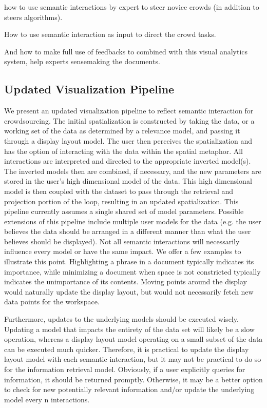 \documentclass[journal]{vgtc}                %
\begin{document}
how to use semantic interactions by expert to steer novice crowds (in addition to steers algorithms). 

How to use semantic interaction as input to direct the crowd tasks.

And how to make full use of feedbacks to combined with this visual analytics system, help experts sensemaking the documents.


\subsection{Updated Visualization Pipeline}

We present an updated visualization pipeline to reflect semantic interaction for crowdsourcing. 
The initial spatialization is constructed by taking the data, or a working set of the data as determined by a relevance model, and passing it through a display layout model. 
The user then perceives the spatialization and has the option of interacting with the data within the spatial metaphor. 
All interactions are interpreted and directed to the appropriate inverted model(s). 
The inverted models then are combined, if necessary, and the new parameters are stored in the user’s high dimensional model of the data.
This high dimensional model is then coupled with the dataset to pass through the retrieval and projection portion of the loop, resulting in an updated spatialization. 
This pipeline currently assumes a single shared set of model parameters. 
Possible extensions of this pipeline include multiple user models for the data (e.g. the user believes the data should be arranged in a different manner than what the user believes should be displayed).
Not all semantic interactions will necessarily influence every model or have the same impact. 
We offer a few examples to illustrate this point. 
Highlighting a phrase in a document typically indicates its importance, while minimizing a document when space is not constricted typically indicates the unimportance of its contents.
Moving points around the display would naturally update the display layout, but would not necessarily fetch new data points for the workspace.

Furthermore, updates to the underlying models should be executed wisely. 
Updating a model that impacts the entirety of the data set will likely be a slow operation, whereas a display layout model operating on a small subset of the data can be executed much quicker. 
Therefore, it is practical to update the display layout model with each semantic interaction, but it may not be practical to do so for the information retrieval model.
Obviously, if a user explicitly queries for information, it should be returned promptly. 
Otherwise, it may be a better option to check for new potentially relevant information and/or update the underlying model every n interactions.
\end{document}
